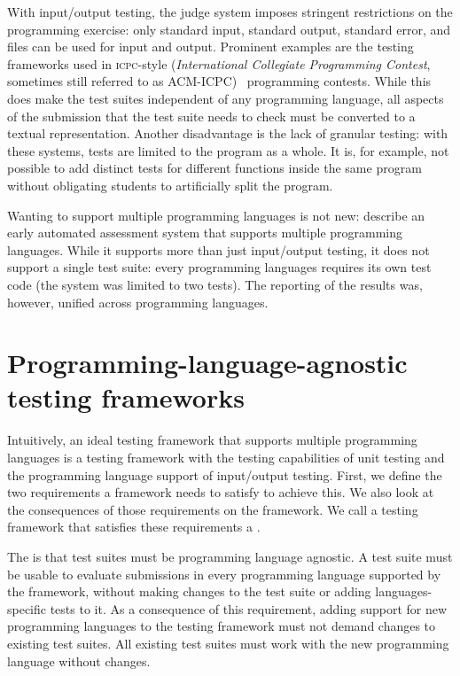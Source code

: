 \documentclass[../main]{subfiles}
\begin{document}
With input/output testing, the judge system imposes stringent restrictions on the programming exercise: only standard input, standard output, standard error, and files can be used for input and output.
Prominent examples are the testing frameworks used in \textsc{icpc}-style (\emph{International Collegiate Programming Contest}, sometimes still referred to as ACM-ICPC)~\autocite{ICPCFactSheet2023} programming contests.
While this does make the test suites independent of any programming language, all aspects of the submission that the test suite needs to check must be converted to a textual representation.
Another disadvantage is the lack of granular testing: with these systems, tests are limited to the program as a whole.
It is, for example, not possible to add distinct tests for different functions inside the same program without obligating students to artificially split the program.

Wanting to support multiple programming languages is not new: \textcite{hextAutomaticGradingScheme1969} describe an early automated assessment system that supports multiple programming languages.
While it supports more than just input/output testing, it does not support a single test suite: every programming languages requires its own test code (the system was limited to two tests).
The reporting of the results was, however, unified across programming languages.

\section{Programming-language-agnostic testing frameworks}\label{sec:tested1-programming-language-agnostic-test-frameworks}

Intuitively, an ideal testing framework that supports multiple programming languages is a testing framework with the testing capabilities of unit testing and the programming language support of input/output testing.
First, we define the two requirements a framework needs to satisfy to achieve this.
We also look at the consequences of those requirements on the framework.
We call a testing framework that satisfies these requirements a .

The  is that test suites must be programming language agnostic.
A test suite must be usable to evaluate submissions in every programming language supported by the framework, without making changes to the test suite or adding languages-specific tests to it.
As a consequence of this requirement, adding support for new programming languages to the testing framework must not demand changes to existing test suites.
All existing test suites must work with the new programming language without changes.
\end{document}
